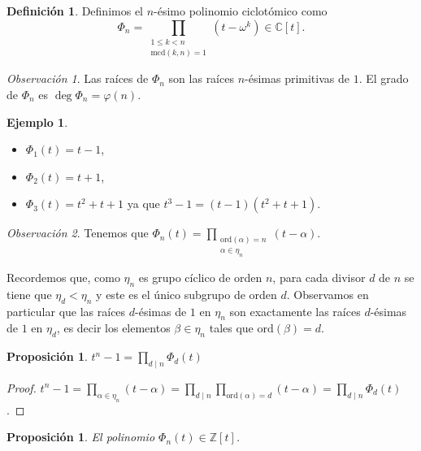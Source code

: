 \documentclass[10pt, spanish]{report}
\newtheorem{prop}[tma]{Proposición}
\theoremstyle{definition}
\newtheorem*{defin}{Definición}
\newtheorem*{ej}{Ejemplo}
\theoremstyle{custom}
\theoremstyle{remark}
\newtheorem*{obs}{Observación}
\newcommand{\Z}{\mathbb{Z}}
\newcommand{\C}{\mathbb{C}}
\newcommand{\ord}[1]{\text{ord}(#1)}
\newcommand{\mcd}[1]{\text{mcd}(#1)}
\renewcommand{\leq}{\leqslant}
\begin{document}
\begin{defin}
    Definimos el $n$-ésimo polinomio ciclotómico como
    \[\Phi_n=\prod_{\substack{1\leq k<n\\ \mcd{k,n}=1}}(t-\omega^k)\in\C[t].\]   
\end{defin}

\begin{obs}
    Las raíces de $\Phi_n$ son las raíces $n$-ésimas primitivas de $1$. El grado
    de $\Phi_n$ es $\deg{\Phi_n}=\varphi(n)$.
\end{obs}

\begin{ej}\hspace{0pt}
    \begin{itemize}
        \item $\Phi_1(t)=t-1$,
        \item $\Phi_2(t)=t+1$,
        \item $\Phi_3(t)=t^2+t+1$ ya que $t^3-1=(t-1)(t^2+t+1)$. 
    \end{itemize}
\end{ej}

\begin{obs}
    Tenemos que
    $\Phi_n(t)=\prod_{\substack{\ord{\alpha}=n\\\alpha\in\eta_n}}(t-\alpha)$.

    Recordemos que, como $\eta_n$ es grupo cíclico de orden $n$, para cada
    divisor $d$ de $n$ se tiene que $\eta_d < \eta_n$ y este es el único
    subgrupo de orden $d$. Observamos en particular que las raíces $d$-ésimas
    de $1$ en $\eta_n$ son exactamente las raíces $d$-ésimas de $1$ en $\eta_d$,
    es decir los elementos $\beta\in\eta_n$ tales que $\ord{\beta}=d$.  
\end{obs}

\begin{prop}\label{prop:formulafn}
    $t^n-1=\prod_{d\mid n}\Phi_d(t)$ 
\end{prop}

\begin{proof}
    $\displaystyle t^n-1 =\prod_{\alpha\in\eta_n}(t-\alpha) =\prod_{d\mid
    n}\prod_{\ord{\alpha}=d}(t-\alpha) =\prod_{d\mid n}\Phi_d(t)$.
\end{proof}

\begin{prop}
    El polinomio $\Phi_n(t)\in\Z[t]$.  
\end{prop}
\end{document}
